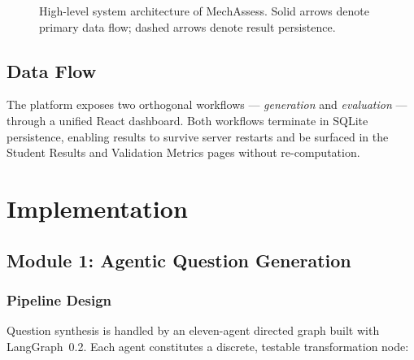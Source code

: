 \documentclass[conference]{IEEEtran}
\begin{document}
\begin{figure}[H]
\caption{High-level system architecture of MechAssess. Solid arrows denote primary data flow; dashed arrows denote result persistence.}
\label{fig:arch}
\end{figure}

\subsection{Data Flow}

The platform exposes two orthogonal workflows — \emph{generation} and \emph{evaluation} — through a unified React dashboard. Both workflows terminate in SQLite persistence, enabling results to survive server restarts and be surfaced in the Student Results and Validation Metrics pages without re-computation.

\section{Implementation}
\label{sec:impl}

\subsection{Module 1: Agentic Question Generation}
\label{ssec:gen}

\subsubsection{Pipeline Design}

Question synthesis is handled by an eleven-agent directed graph built with LangGraph~0.2. Each agent constitutes a discrete, testable transformation node:
\end{document}
